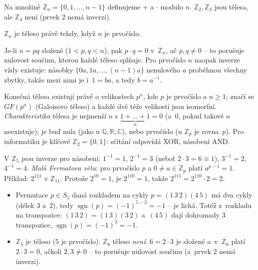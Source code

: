\documentclass[11pt,a4paper]{article}
\newcommand{\sgn}{\operatorname{sgn}}
\begin{document}
\begin{priklad}
Na množině $\mathbb{Z}_n=\{0,1,\dots,n-1\}$ definujeme $+$ a $\cdot$ modulo $n$. $\mathbb{Z}_2,\mathbb{Z}_3$ jsou tělesa, ale $\mathbb{Z}_4$ není (prvek $2$ nemá inverzi).
\end{priklad}

\begin{veta}
$\mathbb{Z}_n$ je těleso právě tehdy, když $n$ je prvočíslo.
\end{veta}

\begin{intuice}
Je-li $n=pq$ složené ($1<p,q<n$), pak $p\cdot q=0$ v~$\mathbb{Z}_n$, ač $p,q\neq0$ -- to porušuje nulovost součinu, kterou každé těleso splňuje. Pro prvočíslo $n$ naopak inverze vždy existuje: násobky $\{0a,1a,\dots,(n-1)a\}$ nenulového $a$ proběhnou všechny zbytky, takže mezi nimi je i~$1=ba$, a tedy $b=a^{-1}$.
\end{intuice}

\begin{poznamka}
Konečná tělesa existují právě o velikostech $p^n$, kde $p$ je prvočíslo a $n\ge1$; značí se $GF(p^n)$ (Galoisovo těleso) a každé dvě téže velikosti jsou isomorfní. \emph{Charakteristika} tělesa je nejmenší $n$ s $\underbrace{1+\dots+1}_{n}=0$ (a~$0$, pokud takové $n$ neexistuje); je buď nula (jako u $\mathbb{Q},\mathbb{R},\mathbb{C}$), nebo prvočíslo (u $\mathbb{Z}_p$ je rovna~$p$). Pro informatiku je klíčové $\mathbb{Z}_2=\{0,1\}$: sčítání odpovídá XOR, násobení AND.
\end{poznamka}

\begin{priklad}
V $\mathbb{Z}_5$ jsou inverze pro násobení: $1^{-1}=1$, $2^{-1}=3$ (neboť $2\cdot3=6\equiv1$), $3^{-1}=2$, $4^{-1}=4$. \emph{Malá Fermatova věta}: pro prvočíslo $p$ a $0\neq a\in\mathbb{Z}_p$ platí $a^{p-1}=1$. Příklad: $2^{111}$ v $\mathbb{Z}_{11}$. Protože $2^{10}=1$, je $2^{110}=1$, takže $2^{111}=2^{110}\cdot2=2$.
\end{priklad}

\begin{priklad}
\begin{itemize}
  \item[(a)] Permutace $p\in S_5$ daná rozkladem na cykly $p=(1\,3\,2)(4\,5)$ má dva cykly (délek $3$ a~$2$), tedy $\sgn(p)=(-1)^{5-2}=-1$ -- je lichá. Totéž z~rozkladu na transpozice: $(1\,3\,2)=(1\,3)(3\,2)$ a~$(4\,5)$ dají dohromady $3$ transpozice, $\sgn(p)=(-1)^3=-1$.
  \item[(b)] $\mathbb{Z}_5$ je těleso ($5$ je prvočíslo). $\mathbb{Z}_6$ těleso \emph{není}: $6=2\cdot3$ je složené a~v~$\mathbb{Z}_6$ platí $2\cdot3=0$, ačkoli $2,3\neq0$ -- to porušuje nulovost součinu (a~prvek $2$ nemá inverzi).
\end{itemize}
\end{priklad}
\end{document}
